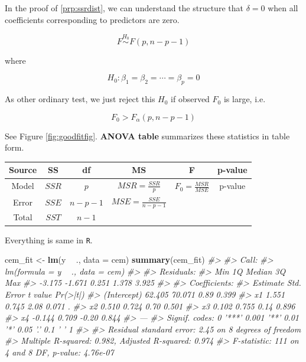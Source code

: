 \documentclass[]{book}
\newenvironment{Shaded}{\begin{snugshade}}{\end{snugshade}}
\newcommand{\CommentTok}[1]{\textcolor[rgb]{0.56,0.35,0.01}{\textit{#1}}}
\newcommand{\DataTypeTok}[1]{\textcolor[rgb]{0.13,0.29,0.53}{#1}}
\newcommand{\KeywordTok}[1]{\textcolor[rgb]{0.13,0.29,0.53}{\textbf{#1}}}
\newcommand{\NormalTok}[1]{#1}
\newcommand{\OperatorTok}[1]{\textcolor[rgb]{0.81,0.36,0.00}{\textbf{#1}}}
\newcommand{\StringTok}[1]{\textcolor[rgb]{0.31,0.60,0.02}{#1}}
\theoremstyle{definition}
\theoremstyle{definition}
\theoremstyle{definition}
\theoremstyle{remark}
\begin{document}
In the proof of \ref{prp:ssrdist}, we can understand the structure that \(\delta = 0\) when all coefficients corresponding to predictors are zero.

\[F \stackrel{H_0}{\sim} F(p, n - p - 1)\]

where

\[H_0: \beta_1 = \beta_2 = \cdots = \beta_p = 0\]

As other ordinary test, we just reject this \(H_0\) if observed \(F_0\) is large, i.e.

\[F_0 > F_{\alpha}(p, n - p - 1)\]

See Figure \ref{fig:goodfitfig}. \textbf{ANOVA table} summarizes these statistics in table form.

\begin{longtable}[]{@{}cccccc@{}}
\toprule
Source & SS & df & MS & F & p-value\tabularnewline
\midrule
\endhead
Model & \(SSR\) & \(p\) & \(MSR = \frac{SSR}{p}\) & \(F_0 = \frac{MSR}{MSE}\) & p-value\tabularnewline
Error & \(SSE\) & \(n - p - 1\) & \(MSE = \frac{SSE}{n - p - 1}\) & &\tabularnewline
Total & \(SST\) & \(n - 1\) & & &\tabularnewline
\bottomrule
\end{longtable}

Everything is same in \texttt{R}.

\begin{Shaded}
\begin{Highlighting}[]
\NormalTok{cem_fit <-}\StringTok{ }\KeywordTok{lm}\NormalTok{(y }\OperatorTok{~}\StringTok{ }\NormalTok{., }\DataTypeTok{data =}\NormalTok{ cem)}
\KeywordTok{summary}\NormalTok{(cem_fit)}
\CommentTok{#> }
\CommentTok{#> Call:}
\CommentTok{#> lm(formula = y ~ ., data = cem)}
\CommentTok{#> }
\CommentTok{#> Residuals:}
\CommentTok{#>    Min     1Q Median     3Q    Max }
\CommentTok{#> -3.175 -1.671  0.251  1.378  3.925 }
\CommentTok{#> }
\CommentTok{#> Coefficients:}
\CommentTok{#>             Estimate Std. Error t value Pr(>|t|)  }
\CommentTok{#> (Intercept)   62.405     70.071    0.89    0.399  }
\CommentTok{#> x1             1.551      0.745    2.08    0.071 .}
\CommentTok{#> x2             0.510      0.724    0.70    0.501  }
\CommentTok{#> x3             0.102      0.755    0.14    0.896  }
\CommentTok{#> x4            -0.144      0.709   -0.20    0.844  }
\CommentTok{#> ---}
\CommentTok{#> Signif. codes:  0 '***' 0.001 '**' 0.01 '*' 0.05 '.' 0.1 ' ' 1}
\CommentTok{#> }
\CommentTok{#> Residual standard error: 2.45 on 8 degrees of freedom}
\CommentTok{#> Multiple R-squared:  0.982,  Adjusted R-squared:  0.974 }
\CommentTok{#> F-statistic:  111 on 4 and 8 DF,  p-value: 4.76e-07}
\end{Highlighting}
\end{Shaded}
\end{document}
